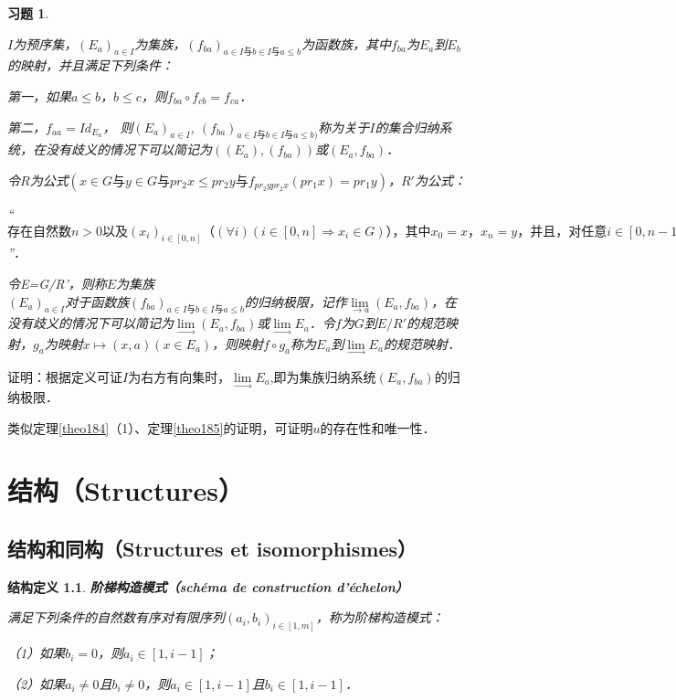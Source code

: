 \documentclass[12pt, a4paper, oneside]{book}
\newtheorem{STdef}{结构定义}
\newtheorem{exer}{习题}
\begin{document}
			\begin{exer}\label{exer197}
				\hfill\par
				$I$为预序集，$(E_a)_{a\in I}$为集族，$(f_{ba})_{a\in I\text{与}b\in I\text{与}a\leq b}$为函数族，其中$f_{ba}$为$E_a$到$E_b$的映射，并且满足下列条件：
				\par
				第一，如果$a\leq b$，$b\leq c$，则$f_{ba}\circ f_{cb}=f_{ca}$．
				\par
				第二，$f_{aa}=Id_{E_a}$，
				则$(E_a)_{a\in I}$, $(f_{ba})_{a\in I\text{与}b\in I\text{与}a\leq b)}$称为关于$I$的集合归纳系统，在没有歧义的情况下可以简记为$((E_a), (f_{ba}))$或$(E_a, f_{ba})$．
				\par
				令$R$为公式$(x\in G\text{与}y\in G\text{与}pr_2x\leq pr_2y\text{与}f_{pr_2y pr_2x}(pr_1x)=pr_1y)$，$R'$为公式：
				\par
				“$\text{存在自然数}n>0\text{以及}(x_i)_{i\in [0, n]}\text{（}(\forall i)(i\in [0, n]\Rightarrow x_i\in G)\text{），其中}x_0=x\text{，}x_n=y\text{，并且，}\text{对任意}i\in [0, n-1]\text{，}(x_{i+1}|y)(x_i|x)R\text{或}(x_i|y)(x_{i+1}|x)R\text{为真}$”．
				\par
				令E=G/R'，则称$E$为集族\\$(E_a)_{a\in I}$对于函数族$(f_{ba})_{a\in I\text{与}b\in I\text{与}a\leq b}$的归纳极限，记作$\lim\limits_{\to a}(E_a, f_{ba})$，在没有歧义的情况下可以简记为$\lim\limits_\to (E_a, f_{ba})$或$\lim\limits_\to E_a$．令$f$为$G$到$E/R'$的规范映射，$g_a$为映射$x\mapsto (x, a)(x\in E_a)$，则映射$f\circ g_a$称为$E_a$到$\lim\limits_\to E_a$的规范映射．
			\end{exer}
			证明：根据定义可证$I$为右方有向集时，$\lim\limits_\to E_a$,即为集族归纳系统$(E_a, f_{ba})$的归纳极限．
			\par
			类似定理\ref{theo184}（1）、定理\ref{theo185}的证明，可证明$u$的存在性和唯一性．

	\chapter{结构（Structures）}
		\section{结构和同构（Structures et isomorphismes）}		
			\begin{STdef}
				\textbf{阶梯构造模式（schéma de construction d'échelon）}
				\par
				满足下列条件的自然数有序对有限序列$(a_i, b_i)_{i\in [1, m]}$，称为阶梯构造模式：
				\par
				（1）如果$b_i=0$，则$a_i\in [1, i-1]$； 
				\par
				（2）如果$a_i\neq 0$且$b_i\neq 0$，则$a_i\in [1, i-1]$且$b_i\in [1, i-1]$．
			\end{STdef}
\end{document}
